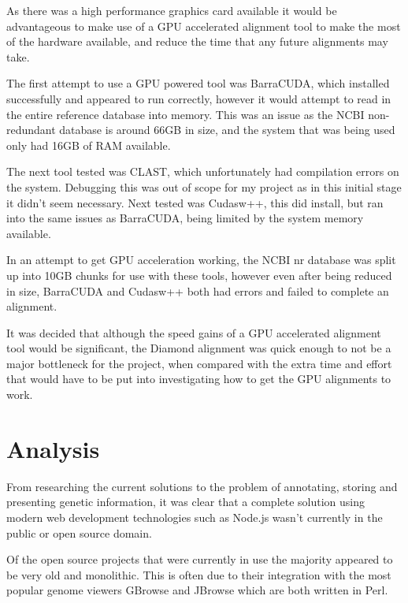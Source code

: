 As there was a high performance graphics card available it would be advantageous to make use of a GPU accelerated alignment tool to make the most of the hardware available, and reduce the time that any future alignments may take. 

The first attempt to use a GPU powered tool was BarraCUDA\cite{barracuda}, which installed successfully and appeared to run correctly, however it would attempt to read in the entire reference database into memory. This was an issue as the NCBI non-redundant database is around 66GB in size, and the system that was being used only had 16GB of RAM available. 

The next tool tested was CLAST\cite{clast}, which unfortunately had compilation errors on the system. Debugging this was out of scope for my project as in this initial stage it didn't seem necessary. Next tested was Cudasw++\cite{cudasw}, this did install, but ran into the same issues as BarraCUDA, being limited by the system memory available. 

In an attempt to get GPU acceleration working, the NCBI nr database was split up into 10GB chunks for use with these tools, however even after being reduced in size, BarraCUDA and Cudasw++ both had errors and failed to complete an alignment. 

It was decided that although the speed gains of a GPU accelerated alignment tool would be significant, the Diamond alignment was quick enough to not be a major bottleneck for the project, when compared with the extra time and effort that would have to be put into investigating how to get the GPU alignments to work. 

\section{Analysis}

From researching the current solutions to the problem of annotating, storing and presenting genetic information, it was clear that a complete solution using modern web development technologies such as Node.js wasn't currently in the public or open source domain. 

Of the open source projects that were currently in use the majority appeared to be very old and monolithic. This is often due to their integration with the most popular genome viewers GBrowse\cite{gbrowse} and JBrowse\cite{jbrowse} which are both written in Perl.

